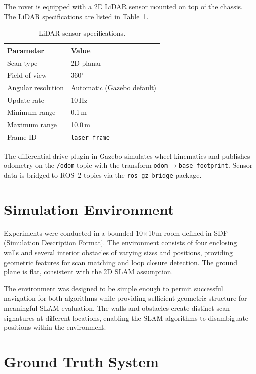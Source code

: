 The rover is equipped with a 2D LiDAR sensor mounted on top of the chassis. The LiDAR specifications are listed in Table~\ref{tab:lidar_specs}.

\begin{table}[htbp]
\centering
\caption{LiDAR sensor specifications.}
\label{tab:lidar_specs}
\begin{tabular}{ll}
\toprule
\textbf{Parameter} & \textbf{Value} \\
\midrule
Scan type & 2D planar \\
Field of view & 360$^\circ$ \\
Angular resolution & Automatic (Gazebo default) \\
Update rate & 10\,Hz \\
Minimum range & 0.1\,m \\
Maximum range & 10.0\,m \\
Frame ID & \texttt{laser\_frame} \\
\bottomrule
\end{tabular}
\end{table}

The differential drive plugin in Gazebo simulates wheel kinematics and publishes odometry on the \texttt{/odom} topic with the transform \texttt{odom}$\rightarrow$\texttt{base\_footprint}. Sensor data is bridged to ROS~2 topics via the \texttt{ros\_gz\_bridge} package.

\section{Simulation Environment}

Experiments were conducted in a bounded 10$\times$10\,m room defined in SDF (Simulation Description Format). The environment consists of four enclosing walls and several interior obstacles of varying sizes and positions, providing geometric features for scan matching and loop closure detection. The ground plane is flat, consistent with the 2D SLAM assumption.

The environment was designed to be simple enough to permit successful navigation for both algorithms while providing sufficient geometric structure for meaningful SLAM evaluation. The walls and obstacles create distinct scan signatures at different locations, enabling the SLAM algorithms to disambiguate positions within the environment.

\section{Ground Truth System}

